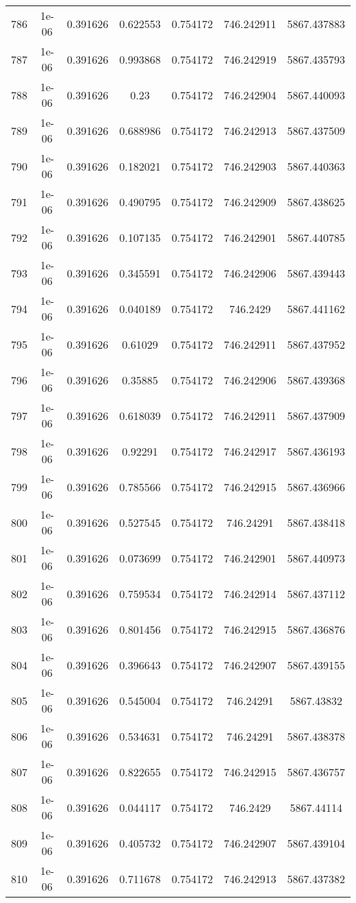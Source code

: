 \begin{table}
\begin{tabular*}{\linewidth}{c|c|c|c|c|c|c}
786 & 1e-06 & 0.391626 & 0.622553 & 0.754172 & 746.242911 & 5867.437883\\
787 & 1e-06 & 0.391626 & 0.993868 & 0.754172 & 746.242919 & 5867.435793\\
788 & 1e-06 & 0.391626 & 0.23 & 0.754172 & 746.242904 & 5867.440093\\
789 & 1e-06 & 0.391626 & 0.688986 & 0.754172 & 746.242913 & 5867.437509\\
790 & 1e-06 & 0.391626 & 0.182021 & 0.754172 & 746.242903 & 5867.440363\\
791 & 1e-06 & 0.391626 & 0.490795 & 0.754172 & 746.242909 & 5867.438625\\
792 & 1e-06 & 0.391626 & 0.107135 & 0.754172 & 746.242901 & 5867.440785\\
793 & 1e-06 & 0.391626 & 0.345591 & 0.754172 & 746.242906 & 5867.439443\\
794 & 1e-06 & 0.391626 & 0.040189 & 0.754172 & 746.2429 & 5867.441162\\
795 & 1e-06 & 0.391626 & 0.61029 & 0.754172 & 746.242911 & 5867.437952\\
796 & 1e-06 & 0.391626 & 0.35885 & 0.754172 & 746.242906 & 5867.439368\\
797 & 1e-06 & 0.391626 & 0.618039 & 0.754172 & 746.242911 & 5867.437909\\
798 & 1e-06 & 0.391626 & 0.92291 & 0.754172 & 746.242917 & 5867.436193\\
799 & 1e-06 & 0.391626 & 0.785566 & 0.754172 & 746.242915 & 5867.436966\\
800 & 1e-06 & 0.391626 & 0.527545 & 0.754172 & 746.24291 & 5867.438418\\
801 & 1e-06 & 0.391626 & 0.073699 & 0.754172 & 746.242901 & 5867.440973\\
802 & 1e-06 & 0.391626 & 0.759534 & 0.754172 & 746.242914 & 5867.437112\\
803 & 1e-06 & 0.391626 & 0.801456 & 0.754172 & 746.242915 & 5867.436876\\
804 & 1e-06 & 0.391626 & 0.396643 & 0.754172 & 746.242907 & 5867.439155\\
805 & 1e-06 & 0.391626 & 0.545004 & 0.754172 & 746.24291 & 5867.43832\\
806 & 1e-06 & 0.391626 & 0.534631 & 0.754172 & 746.24291 & 5867.438378\\
807 & 1e-06 & 0.391626 & 0.822655 & 0.754172 & 746.242915 & 5867.436757\\
808 & 1e-06 & 0.391626 & 0.044117 & 0.754172 & 746.2429 & 5867.44114\\
809 & 1e-06 & 0.391626 & 0.405732 & 0.754172 & 746.242907 & 5867.439104\\
810 & 1e-06 & 0.391626 & 0.711678 & 0.754172 & 746.242913 & 5867.437382\\
\end{tabular*}
\end{table}
